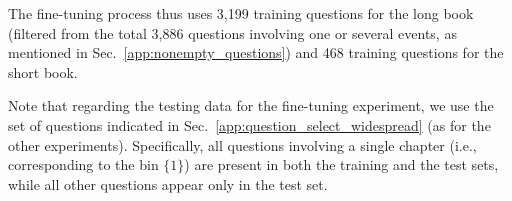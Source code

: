 \documentclass{article}
\begin{document}

The fine-tuning process thus uses 3,199 training questions for the long book (filtered from the total 3,886 questions involving one or several events, as mentioned in Sec.~\ref{app:nonempty_questions}) and 468 training questions for the short book.

Note that regarding the testing data for the fine-tuning experiment, we use the set of questions indicated in Sec.~\ref{app:question_select_widespread} (as for the other experiments). Specifically, all questions involving a single chapter (i.e., corresponding to the bin $\lbrace 1\rbrace$) are present in both the training and the test sets, while all other questions appear only in the test set.


\end{document}
